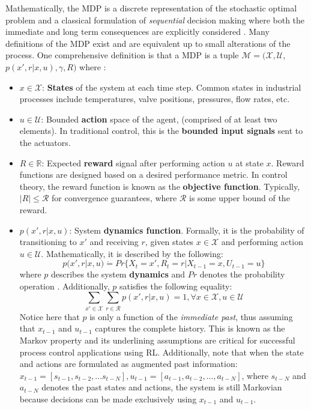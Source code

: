Mathematically, the MDP is a discrete representation of the stochastic optimal problem and a classical formulation of \textit{sequential} decision making where both the immediate and long term consequences are explicitly considered \cite{bellman1, mdp_bellman}. Many definitions of the MDP exist and are equivalent up to small alterations of the process.  One comprehensive definition is that a MDP is a tuple $\mathcal{M} = (\mathcal{X}, \mathcal{U}$, $p(x', r|x, u), \gamma, R)$ where \cite{ng_ref12}:
\begin{itemize}
    \item $x \in \mathcal{X}$: \textbf{States} of the system at each time step. Common states in industrial processes include temperatures, valve positions, pressures, flow rates, etc.
    \item $u \in \mathcal{U}$: Bounded \textbf{action} space of the agent, (comprised of at least two elements). In traditional control, this is the \textbf{bounded input signals} sent to the actuators.
    \item $R \in \mathbb{R}$: Expected \textbf{reward} signal after performing action $u$ at state $x$. Reward functions are designed based on a desired performance metric.  In control theory, the reward function is known as the \textbf{objective function}.  Typically, $|R| \leq \mathcal{R}$ for convergence guarantees, where $\mathcal{R}$ is some upper bound of the reward.
    \item $p(x', r|x, u)$: System \textbf{dynamics function}. Formally, it is the probability of transitioning to $x'$ and receiving $r$,  given states $x \in \mathcal{X}$ and performing action $u \in \mathcal{U}$. Mathematically, it is described by the following:
    \begin{equation}
        p(x', r | x, u) \dot{=} Pr\{X_t = x', R_t = r | X_{t - 1} = x, U_{t-1} = u\}
        \label{eq:transition_prob}
    \end{equation}
    where $p$ describes the system \textbf{dynamics} and $Pr$ denotes the probability operation \cite{sutton}. Additionally, $p$ satisfies the following equality:
    \begin{equation}
        \sum\limits_{x' \in \mathcal{X}} \sum\limits_{r \in \mathcal{R}} p(x', r | x, u) = 1, \forall x \in \mathcal{X}, u \in \mathcal{U}
        \label{eq:prob}
    \end{equation}
    Notice here that $p$ is only a function of the \textit{immediate past}, thus assuming that $x_{t - 1}$ and $u_{t-1}$ captures the complete history. This is known as the Markov property and its underlining assumptions are critical for successful process control applications using RL. Additionally, note that when the state and actions are formulated as augmented past information: $x_{t-1} = [s_{t-1}, s_{t-2}, ... s_{t-N}], u_{t-1} = [a_{t-1}, a_{t-2}, ..., a_{t-N}]$, where $s_{t-N}$ and $a_{t-N}$ denotes the past states and actions, the system is still Markovian because decisions can be made exclusively using $x_{t-1}$ and $u_{t-1}$. 

\end{itemize}
